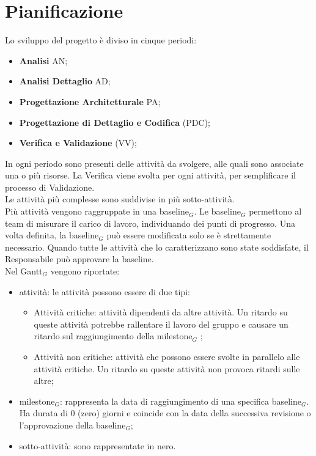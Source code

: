 \chapter{Pianificazione}
Lo sviluppo del progetto è diviso in cinque periodi:
\begin{itemize}
    \item \textbf{Analisi} AN;
    \item \textbf{Analisi Dettaglio} AD;
    \item \textbf{Progettazione Architetturale} PA;
    \item \textbf{Progettazione di Dettaglio e Codifica} (PDC);
    \item \textbf{Verifica e Validazione} (VV);
\end{itemize}
In ogni periodo sono presenti delle attività da svolgere, alle quali sono associate una o più risorse. La Verifica viene svolta per ogni attività, per semplificare il processo di Validazione.\\
Le attività più complesse sono suddivise in più sotto-attività.\\Più attività vengono raggruppate in una baseline$_{G}$. Le baseline$_{G}$ permettono al team di misurare il carico di lavoro, individuando dei punti di progresso. Una volta definita, la baseline$_{G}$ può essere modificata solo se è strettamente necessario. Quando tutte le attività che lo caratterizzano sono state soddisfate, il Responsabile può approvare la baseline.\\
Nel Gantt$_{G}$ vengono riportate:
\begin{itemize}
    \item attività: le attività possono essere di due tipi:
    \begin{itemize}
        \item Attività critiche: attività dipendenti da altre attività. Un ritardo su queste attività potrebbe rallentare il lavoro del gruppo e causare un ritardo sul raggiungimento della milestone$_{G}$ ;
        \item Attività non critiche: attività che possono essere svolte in parallelo alle attività critiche. Un ritardo su queste attività non provoca ritardi sulle altre;
    \end{itemize}
    \item milestone$_{G}$: rappresenta la data di raggiungimento di una specifica baseline$_{G}$. Ha durata di 0 (zero) giorni e coincide con la data della successiva revisione o l'approvazione della baseline$_{G}$;
    \item sotto-attività: sono rappresentate in nero. 
\end{itemize}